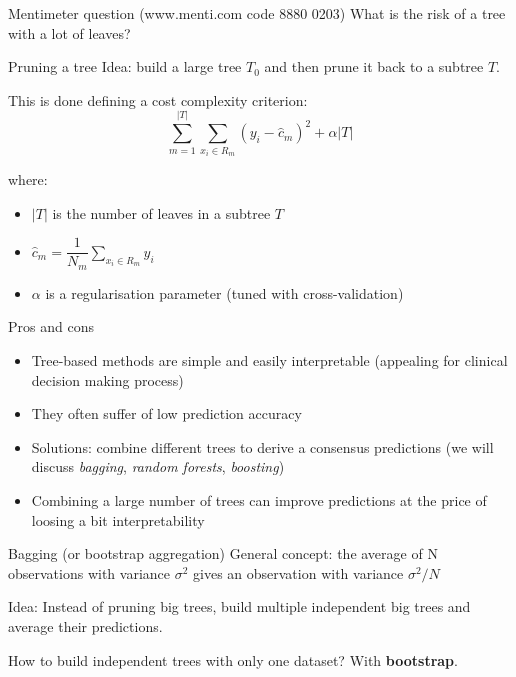 \documentclass[notes]{beamer}          %
\begin{document}
\begin{frame}{Mentimeter question (www.menti.com code 8880 0203)}
What is the risk of a tree with a lot of leaves?
\end{frame}

\begin{frame}{Pruning a tree}
Idea: build a large tree $T_0$ and then prune it back to a subtree $T$.

This is done defining a cost complexity criterion:
$$\sum_{m=1}^{|T|}\sum_{x_i\in R_m}(y_i-\hat c_m)^2+\alpha|T|$$

where:
\begin{itemize}
\item $|T|$ is the number of leaves in a subtree $T$
\item $ \hat c_m = \dfrac{1}{N_m}\sum_{x_i\in R_m}y_i$
\item $\alpha$ is a regularisation parameter (tuned with cross-validation)
\end{itemize}
\end{frame}

\begin{frame}{Pros and cons}
\begin{itemize}
 \item Tree-based methods are simple and easily interpretable (appealing for clinical decision making process)
 \item They often suffer of low prediction accuracy
 \item Solutions: combine different trees to derive a consensus predictions (we will discuss  \textit{bagging}, \textit{random forests}, \textit{boosting})
 \item Combining a large number of trees can improve predictions at the price of loosing a bit interpretability
\end{itemize}
\end{frame}



\begin{frame}{Bagging (or bootstrap aggregation)}
General concept: the average of N observations with variance $\sigma^2$ gives an observation with variance $\sigma^2/N$

\vspace{1cm}

Idea: Instead of pruning big trees, build multiple independent big trees and average their predictions.

\vspace{1cm}

How to build independent trees with only one dataset? With \textbf{bootstrap}.
\end{frame}
\end{document}
